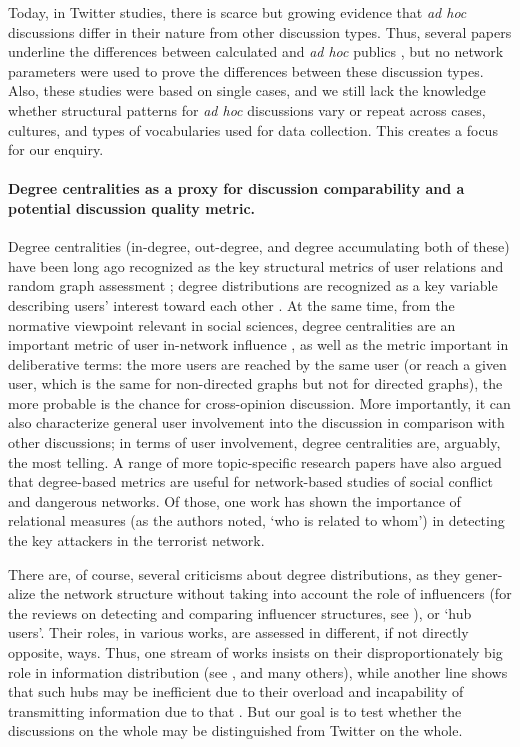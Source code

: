 Today, in Twitter studies, there is scarce but growing evidence that \textit{ad hoc} discussions differ in their nature from other discussion types. Thus, several papers underline the differences between calculated and \textit{ad hoc} publics \cite{BrunsBurgess2015,LynnRosatiNair}, but no network parameters were used to prove the differences between these discussion types. Also, these studies were based on single cases, and we still lack the knowledge whether structural patterns for \textit{ad hoc} discussions vary or repeat across cases, cultures, and types of vocabularies used for data collection. This creates a focus for our enquiry.

\paragraph{Degree centralities as a proxy for discussion comparability and a potential discussion quality metric.} Degree centralities (in-degree, out-degree, and degree accumulating both of these) have been long ago recognized as the key structural metrics of user relations and random graph assessment \cite{AlbertBarabasi,BoccalettiLatoraMoreno,MisloveMarconGummadi}; degree distributions are recognized as a key variable describing users’ interest toward each other \cite{EdigerJiangRiedy}. At the same time, from the normative viewpoint relevant in social sciences, degree centralities are an important metric of user in-network influence \cite{BodrunovaLitvinenkoBlekanov2016}, as well as the metric important in deliberative terms: the more users are reached by the same user (or reach a given user, which is the same for non-directed graphs but not for directed graphs), the more probable is the chance for cross-opinion discussion. More importantly, it can also characterize general user involvement into the discussion in comparison with other discussions; in terms of user involvement, degree centralities are, arguably, the most telling. A range of more topic-specific research papers have also argued that degree-based metrics are useful for network-based studies of social conflict and dangerous networks. Of those, one work \cite{KarthinkaGeethaBose} has shown the importance of relational measures (as the authors noted, ‘who is related to whom’) in detecting the key attackers in the terrorist network.

There are, of course, several criticisms about degree distributions, as they gener- alize the network structure without taking into account the role of influencers (for the reviews on detecting and comparing influencer structures, see \cite{BodrunovaBlekanovMaksimov,BodrunovaLitvinenkoBlekanov2017,BodrunovaLitvinenkoBlekanov2016}), or ‘hub users’. Their roles, in various works, are assessed in different, if not directly opposite, ways. Thus, one stream of works insists on their disproportionately big role in information distribution (see \cite{BastosRaimundoTravitzki,DuboisGaffney}, and many others), while another line shows that such hubs may be inefficient due to their overload and incapability of transmitting information due to that \cite{HarriganAchananuparpLim}. But our goal is to test whether the discussions on the whole may be distinguished from Twitter on the whole.

